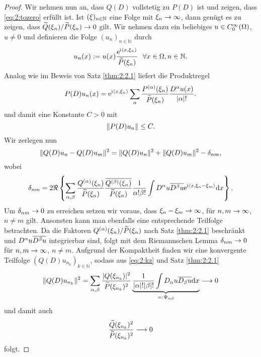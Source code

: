 \begin{proof}
Wir nehmen nun an, dass $Q(D)$ vollstetig zu $P(D)$ ist und zeigen, dass \eqref{eq:2:tozero} erfüllt ist.
 Ist $(\xi)_{n \in \mathbb{N}}$ eine Folge mit $\xi_n \rightarrow \infty$, dann genügt es zu zeigen, dass $\widetilde{Q}(\xi_{n})/\widetilde{P}(\xi_{n})\to0$ gilt.
Wir nehmen dazu ein beliebiges $u\in C^\infty_0(\Omega)$, $u\neq0$ und definieren die Folge $(u_n)_{n \in \mathbb{N}}$ durch
\begin{equation}
u_n(x):=u(x)\frac{\e^{\i\ska{x}{\x_n}}}{\til{P}(\x_n)}\ \ \forall x \in \Omega, n \in \mathbb{N}.
\end{equation}
Analog wie im Beweis von Satz \ref{thm:2:2.1} liefert die Produktregel
\begin{equation}
P(D)u_n(x)=\mathrm e^{\mathrm i\langle x,\xi_n\rangle}\sum_\alpha\frac{P^{(\alpha)}(\xi_n)}{\widetilde{P}(\xi_n)}\frac{D^\alpha u(x)}{|\alpha|!}.
\end{equation}
und damit eine Konstante $C>0$ mit
\begin{equation}\label{eq:2:PDunb}
\lVert P(D)u_n\rVert\leq C.
\end{equation}
Wir zerlegen nun
\begin{equation}\label{eq:2:kz}
\lVert Q(D)u_n-Q(D)u_m\rVert^2=\lVert Q(D)u_n\rVert^2+\lVert Q(D)u_m\rVert^2-\delta_{nm},
\end{equation}
wobei
\begin{equation}
\delta_{nm}=2\Re\left\{\sum_{\alpha,\beta}\frac{Q^{(\alpha)}(\xi_n)}{\widetilde{P}(\xi_n)}\frac{\overline{Q^{(\beta)}(\xi_n)}}{\widetilde{P}(\xi_n)}
\frac1{\alpha!\beta!}\int D^\alpha u\overline{D^\beta u}\mathrm e^{\mathrm i\langle x,\xi_n-\xi_m\rangle}\mathrm{d} x\right\}.
\end{equation}
Um $\delta_{nm}\to0$ zu erreichen setzen wir voraus, dass $\xi_n-\xi_m\to\infty$, für $n,m\to\infty$, $n\neq m$ gilt. Ansonsten kann man ebenfalls eine entsprechende Teilfolge betrachten.
Da die Faktoren $Q^{(\alpha)}(\xi_n)/\widetilde{P}(\xi_n)$ nach Satz \ref{thm:2:2.1} beschränkt und $D^\alpha u\overline{D^\beta u}$ integrierbar sind, folgt mit dem Riemannschen Lemma $\delta_{nm}\to0$ für $n,m\to\infty$, $n\neq m$.
Aufgrund der Kompaktheit finden wir eine konvergente Teilfolge $(Q(D)u_{n_k})_{k \in \mathbb{N}}$, sodass aus \eqref{eq:2:kz} und Satz \ref{thm:2:2.1}
\begin{equation}
\lVert Q(D)u_{n_k}\rVert^2=\sum_{\alpha,\beta}\frac{\lvert Q(\xi_{n_k})\rvert^2}{\widetilde{P}(\xi_{n_k})^2} \underbrace{\frac{1}{|\alpha|! |\beta|!}\int D_\alpha u \overline{D_\beta u} \mathrm{d}x}_{=:\Psi_{\alpha \beta}} \longrightarrow 0
\end{equation}
und damit auch 
\begin{equation}
\frac{\widetilde{Q}(\xi_{n_k})^2}{\widetilde{P}(\xi_{n_k})^2} \longrightarrow 0
\end{equation}
folgt.
\end{proof}
